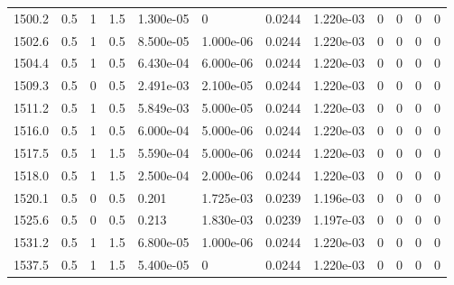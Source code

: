 \documentclass[preview]{standalone}
\begin{document}
{{{{{{{{{\begin{tabular}{L{1.2cm}C{1.2cm} C{0.3cm}C{0.5cm} C{1.4cm}C{1.4cm} C{1.4cm}C{1.4cm} C{1.6cm}C{1.6cm} C{1.6cm}C{1.6cm}}
  1500.2  &   0.5  & 1     & 1.5 &  1.300e-05  & 0  &  0.0244&   1.220e-03& 0 & 0   &  0 & 0  \\ 
  1502.6  &   0.5  & 1     & 0.5 &  8.500e-05  & 1.000e-06  &  0.0244&   1.220e-03& 0 & 0   &  0 & 0  \\ 
  1504.4  &   0.5  & 1     & 0.5 &  6.430e-04  & 6.000e-06  &  0.0244&   1.220e-03& 0 & 0   &  0 & 0  \\ 
  1509.3  &   0.5  & 0     & 0.5 &  2.491e-03  & 2.100e-05  &  0.0244&   1.220e-03& 0 & 0   &  0 & 0  \\ 
  1511.2  &   0.5  & 1     & 0.5 &  5.849e-03  & 5.000e-05  &  0.0244&   1.220e-03& 0 & 0   &  0 & 0  \\ 
  1516.0  &   0.5  & 1     & 0.5 &  6.000e-04  & 5.000e-06  &  0.0244&   1.220e-03& 0 & 0   &  0 & 0  \\ 
  1517.5  &   0.5  & 1     & 1.5 &  5.590e-04  & 5.000e-06  &  0.0244&   1.220e-03& 0 & 0   &  0 & 0  \\ 
  1518.0  &   0.5  & 1     & 1.5 &  2.500e-04  & 2.000e-06  &  0.0244&   1.220e-03& 0 & 0   &  0 & 0  \\ 
  1520.1  &   0.5  & 0     & 0.5 &  0.201  & 1.725e-03  &  0.0239&   1.196e-03& 0 & 0   &  0 & 0  \\ 
  1525.6  &   0.5  & 0     & 0.5 &  0.213  & 1.830e-03  &  0.0239&   1.197e-03& 0 & 0   &  0 & 0  \\ 
  1531.2  &   0.5  & 1     & 1.5 &  6.800e-05  & 1.000e-06  &  0.0244&   1.220e-03& 0 & 0   &  0 & 0  \\ 
  1537.5  &   0.5  & 1     & 1.5 &  5.400e-05  & 0  &  0.0244&   1.220e-03& 0 & 0   &  0 & 0  \\ 
\hline 
\end{tabular} 

}}}}}}}}}
\end{document}

